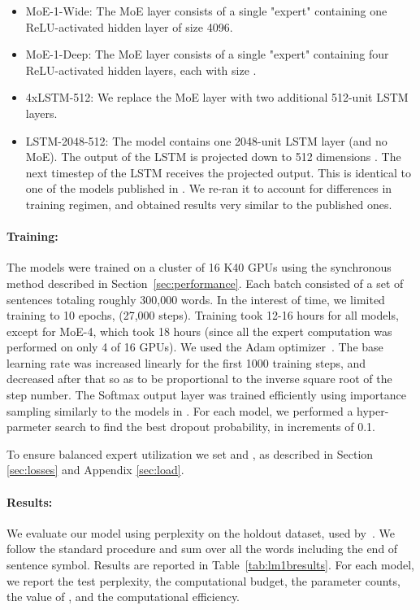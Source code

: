 \documentclass{article} \pdfoutput=1
\begin{document}
\begin{itemize}
  \item MoE-1-Wide: The MoE layer consists of a single "expert" containing one ReLU-activated hidden layer of size 4096.
  \item MoE-1-Deep: The MoE layer consists of a single "expert" containing four ReLU-activated hidden layers, each with size .
  \item 4xLSTM-512: We replace the MoE layer with two additional 512-unit LSTM layers.
  \item LSTM-2048-512: The model contains one 2048-unit LSTM layer (and no MoE).  The output of the LSTM is projected down to 512 dimensions \citep{sak2014long}.  The next timestep of the LSTM receives the projected output.  This is identical to one of the models published in \citep{RafalNoam16}.  We re-ran it to account for differences in training regimen, and obtained results very similar to the published ones.
\end{itemize}

\paragraph{Training:} The models were trained on a cluster of 16 K40 GPUs using the synchronous method described in Section~\ref{sec:performance}.  Each batch consisted of a set of sentences totaling roughly 300,000 words.  In the interest of time, we limited training to 10 epochs, (27,000 steps).  Training took 12-16 hours for all models, except for MoE-4, which took 18 hours (since all the expert computation was performed on only 4 of 16 GPUs).  We used the Adam optimizer~\citep{kingma2014adam}. The base learning rate was increased linearly for the first 1000 training steps, and decreased after that so as to be proportional to the inverse square root of the step number.  The Softmax output layer was trained efficiently using importance sampling similarly to the models in \citep{RafalNoam16}.  For each model, we performed a hyper-parmeter search to find the best dropout probability, in increments of 0.1.

To ensure balanced expert utilization we set  and , as described in Section \ref{sec:losses} and Appendix \ref{sec:load}.

\paragraph{Results:} We evaluate our model using perplexity on the holdout dataset, used by~\citep{chelba2013one,RafalNoam16}. We follow the standard procedure and sum over all the words including the end of sentence symbol.  Results are reported in Table~\ref{tab:lm1bresults}.   For each model, we report the test perplexity, the computational budget, the parameter counts, the value of , and the computational efficiency.
\end{document}

